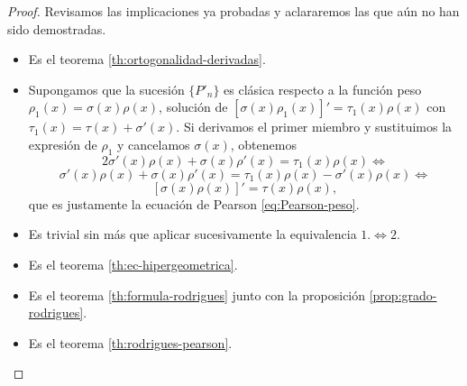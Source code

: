 \begin{proof}
    
    Revisamos las implicaciones ya probadas y aclararemos las que aún no han sido demostradas.
    \begin{itemize}
        \item[\fbox{$1.\Rightarrow 2.$}] Es el teorema \ref{th:ortogonalidad-derivadas}.
        \item[\fbox{$2.\Rightarrow 1.$}] Supongamos que la sucesión $\{P'_n\}$ es clásica respecto a la función peso $\rho_1(x)=\sigma(x)\rho(x)$, solución de $[\sigma(x)\rho_1(x)]'=\tau_1(x)\rho(x)$ con $\tau_1(x)=\tau(x)+\sigma'(x)$. Si derivamos el primer miembro y sustituimos la expresión de $\rho_1$ y cancelamos $\sigma(x)$, obtenemos
        $$
        2\sigma'(x)\rho(x)+\sigma(x)\rho'(x)=\tau_1(x)\rho(x) \Leftrightarrow
        $$ $$
        \sigma'(x)\rho(x)+\sigma(x)\rho'(x) = \tau_1(x)\rho(x) - \sigma'(x)\rho(x) \Leftrightarrow
        $$ $$
        [\sigma(x)\rho(x)]'=\tau(x)\rho(x),
        $$
        que es justamente la ecuación de Pearson \eqref{eq:Pearson-peso}.
        \item[\fbox{$2.\Leftrightarrow 3.$}] Es trivial sin más que aplicar sucesivamente la equivalencia $1.\Leftrightarrow 2.$ 
        \item[\fbox{$1.\Rightarrow 4.$}] Es el teorema \ref{th:ec-hipergeometrica}.
        \item[\fbox{$4.\Rightarrow 5.$}] Es el teorema \ref{th:formula-rodrigues} junto con la proposición \ref{prop:grado-rodrigues}.
        \item[\fbox{$5.\Rightarrow 1.$}] Es el teorema \ref{th:rodrigues-pearson}.
         
    \end{itemize}
\end{proof}

